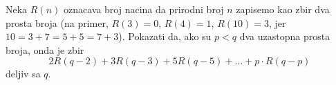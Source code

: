 \problem
Neka $R(n)$ oznacava broj nacina da prirodni broj $n$ zapisemo kao zbir dva prosta broja (na primer, $R(3) = 0$, $R(4) = 1$, $R(10) = 3$, jer $10 = 3 + 7 = 5 + 5 = 7 + 3$).
Pokazati da, ako su $p < q$ dva uzastopna prosta broja, onda je zbir
\[
    2 R (q - 2) + 3 R (q - 3) + 5 R (q - 5) + \ldots + p \cdot R (q - p)
\]
deljiv sa $q$.
\solution
\endproblem
